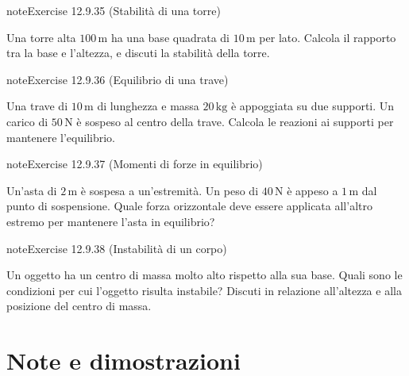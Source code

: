 \documentclass[letterpaper,10pt,italian]{jupyterBook}
\begin{document}
\begin{sphinxadmonition}{note}{Exercise 12.9.35 (Stabilità di una torre)}



\sphinxAtStartPar
Una torre alta \(100 \, \text{m}\) ha una base quadrata di \(10 \, \text{m}\) per lato. Calcola il rapporto tra la base e l’altezza, e discuti la stabilità della torre.
\end{sphinxadmonition}
 \label{exercise:ch/mechanics/dynamics-problems-exercise-35}

\begin{sphinxadmonition}{note}{Exercise 12.9.36 (Equilibrio di una trave)}



\sphinxAtStartPar
Una trave di \(10 \, \text{m}\) di lunghezza e massa \(20 \, \text{kg}\) è appoggiata su due supporti. Un carico di \(50 \, \text{N}\) è sospeso al centro della trave. Calcola le reazioni ai supporti per mantenere l’equilibrio.
\end{sphinxadmonition}
 \label{exercise:ch/mechanics/dynamics-problems-exercise-36}

\begin{sphinxadmonition}{note}{Exercise 12.9.37 (Momenti di forze in equilibrio)}



\sphinxAtStartPar
Un’asta di \(2 \, \text{m}\) è sospesa a un’estremità. Un peso di \(40 \, \text{N}\) è appeso a \(1 \, \text{m}\) dal punto di sospensione. Quale forza orizzontale deve essere applicata all’altro estremo per mantenere l’asta in equilibrio?
\end{sphinxadmonition}
 \label{exercise:ch/mechanics/dynamics-problems-exercise-37}

\begin{sphinxadmonition}{note}{Exercise 12.9.38 (Instabilità di un corpo)}



\sphinxAtStartPar
Un oggetto ha un centro di massa molto alto rispetto alla sua base. Quali sono le condizioni per cui l’oggetto risulta instabile? Discuti in relazione all’altezza e alla posizione del centro di massa.
\end{sphinxadmonition}

\sphinxstepscope


\section{Note e dimostrazioni}
\label{\detokenize{ch/mechanics/dynamics-notes:note-e-dimostrazioni}}\label{\detokenize{ch/mechanics/dynamics-notes:physics-hs-mechanics-dynamics-notes}}\label{\detokenize{ch/mechanics/dynamics-notes::doc}}
\end{document}
